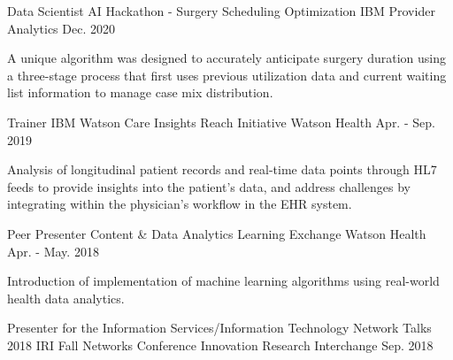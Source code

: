 

\begin{cventries}

  \cventry
    {Data Scientist} %
    {AI Hackathon - Surgery Scheduling Optimization} %
    {IBM Provider Analytics} %
    {Dec. 2020} %
    {
      \begin{cvcompactparagraph}
       A unique algorithm was designed to accurately anticipate surgery duration using a three-stage process that first uses previous utilization data and current waiting list information to manage case mix distribution.
      \end{cvcompactparagraph}
    }
  \cventry
    {Trainer} %
    {IBM Watson Care Insights Reach Initiative} %
    {Watson Health} %
    {Apr. - Sep. 2019} %
    {
      \begin{cvcompactparagraph}
        Analysis of longitudinal patient records and real-time data points through HL7 feeds to provide insights into the patient’s data, and address challenges by integrating within the physician's workflow in the EHR system.
      \end{cvcompactparagraph}
    }
  \cventry
    {Peer Presenter} %
    {Content \& Data Analytics Learning Exchange} %
    {Watson Health} %
    {Apr. - May. 2018} %
    {
      \begin{cvcompactparagraph}
        Introduction of implementation of machine learning algorithms using real-world health data analytics.
      \end{cvcompactparagraph}
    }
  \cventry
    {Presenter for the Information Services/Information Technology Network Talks} %
    {2018 IRI Fall Networks Conference} %
    {Innovation Research Interchange} %
    {Sep. 2018} %
    {
      \begin{cvcompactparagraph}

\end{cvcompactparagraph}}
\end{cventries}
